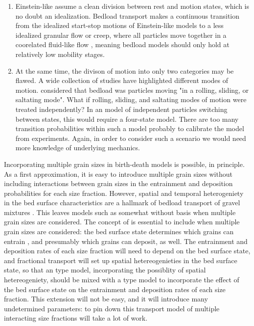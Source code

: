 \begin{enumerate}
	\item Einstein-like assume a clean division between rest and motion states, which is no doubt an idealization. Bedload transport makes a continuous transition from the idealized start-stop motions of Einstein-like models to a less idealized granular flow or creep, where all particles move together in a coorelated fluid-like flow \citep{}, meaning bedload models should only hold at relatively low mobility stages. 
	\item At the same time, the divison of motion into only two categories may be flawed. A wide collection of studies have highlighted different modes of motion. \citet{Einstein1950} considered that bedload was particles moving "in a rolling, sliding, or saltating mode". What if rolling, sliding, and saltating modes of motion were treated independently? In an \citet{Ancey2006} model of independent particles switching between states, this would require a four-state model. There are too many transition probabilities within such a model probably to calibrate the model from experiments. Again, in order to consider such a scenario we would need more knowledge of underlying mechanics. 
	
\end{enumerate}

Incorporating multiple grain sizes in birth-death models is possible, in principle. 
As a first approximation, it is easy to introduce multiple grain sizes without including interactions between grain sizes in the entrainment and deposition probabilities for each size fraction. 
However, spatial and temporal heterogeniety in the bed surface characteristics are a hallmark of bedload transport of gravel mixtures \citep{Hassan2008}. 
This leaves models such as \citet{Ancey2008} somewhat without basis when multiple grain sizes are considered. 
The concept of \citet{Turowski} is essential to include when multiple grain sizes are considered: the bed surface state determines which grains can entrain \citep[e.g.][]{Wilcock2003, Parker1982}, and presumably which grains can deposit, as well. 
The entrainment and deposition rates of each size fraction will need to depend on the bed surface state, and fractional transport will set up spatial hetereogenieties in the bed surface state, so that an \citet{Ancey2014} type model, incorporating the possiblity of spatial hetereogeniety, should be mixed with a \citet{Turowski2009} type model to incorporate the effect of the bed surface state on the entrainment and deposition rates of each size fraction. 
This extension will not be easy, and it will introduce many undetermined parameters: to pin down this transport model of multiple interacting size fractions will take a lot of work. 


